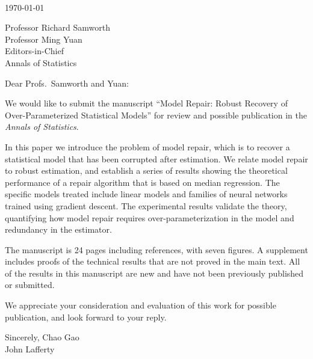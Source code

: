 \documentclass[11pt]{article}
\begin{document}
\thispagestyle{empty}
\mbox{\ }
\vskip1in

\today{}

Professor Richard Samworth\\
Professor Ming Yuan\\
Editors-in-Chief\\
Annals of Statistics
\vskip10pt

Dear Profs.~Samworth and Yuan:

We would like to submit the manuscript ``Model Repair: Robust Recovery of Over-Parameter\-ized Statistical Models'' for review and
possible publication in the {\it Annals of Statistics}.

In this paper we introduce the problem of model repair, which is
to recover a statistical model that has been corrupted after estimation. We relate
model repair to robust estimation, and establish a series of results showing the theoretical performance of a repair algorithm that is based on median regression. The specific models treated include linear models and families of neural networks trained using gradient descent. The experimental results validate the theory, quantifying how model repair requires over-parameterization in the model and redundancy in the estimator.

The manuscript is 24 pages including references, with seven figures.  A supplement includes
proofs of the technical results that are not proved in the main text. All of the
results in this manuscript are new and have not been previously published or submitted.

We appreciate your consideration and evaluation of this work for possible
publication, and look forward to your reply.

Sincerely,
\vskip5pt
Chao Gao\\
John Lafferty
\end{document}
